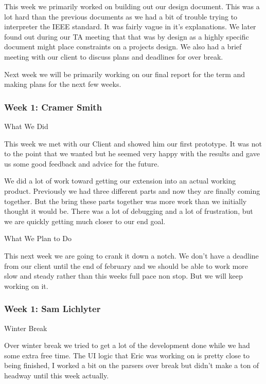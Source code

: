 This week we primarily worked on building out our design document. This was a lot hard than the previous documents as we had a bit of trouble trying to interpreter the IEEE standard. It was fairly vague in it's explanations. We later found out during our TA meeting that that was by design as a highly specific document might place constraints on a projects design. We also had a brief meeting with our client to discuss plans and deadlines for over break.



Next week we will be primarily working on our final report for the term and making plans for the next few weeks. \\ 

 \subsubsection{Week 1: Cramer Smith}

What We Did



This week we met with our Client and showed him our first prototype. It was not to the point that we wanted but he seemed very happy with the results and gave us some good feedback and advice for the future. 



We did a lot of work toward getting our extension into an actual working product. Previously we had three different parts and now they are finally coming together. But the bring these parts together was more work than we initially thought it would be. There was a lot of debugging and a lot of frustration, but we are quickly getting much closer to our end goal.



What We Plan to Do



This next week we are going to crank it down a notch. We don't have a deadline from our client until the end of february and we should be able to work more slow and steady rather than this weeks full pace non stop. But we will keep working on it. \\ 

 \subsubsection{Week 1: Sam Lichlyter}

Winter Break

Over winter break we tried to get a lot of the development done while we had some extra free time. The UI logic that Eric was working on is pretty close to being finished, I worked a bit on the parsers over break but didn't make a ton of headway until this week actually. 



